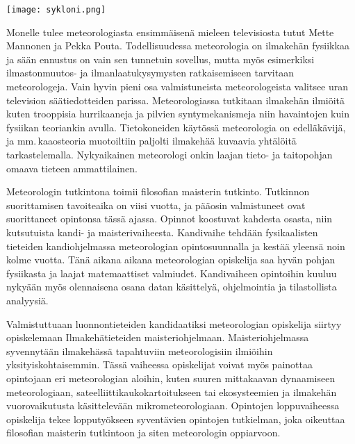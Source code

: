 \documentclass[../ala_hataile.tex]{subfiles}
\begin{document}

\begin{figure*}[!b]
	\texttt{[image: sykloni.png]}
\end{figure*}
Monelle tulee meteorologiasta ensimmäisenä mieleen televisiosta tutut Mette Mannonen ja Pekka Pouta. Todellisuudessa meteorologia on ilmakehän fysiikkaa ja sään ennustus on vain sen tunnetuin sovellus, mutta myös esimerkiksi ilmastonmuutos- ja ilmanlaatukysymysten ratkaisemiseen tarvitaan meteorologeja. Vain hyvin pieni osa valmistuneista meteorologeista valitsee uran television säätiedotteiden parissa. Meteorologiassa tutkitaan ilmakehän ilmiöitä kuten trooppisia hurrikaaneja ja pilvien syntymekanismeja niin havaintojen kuin fysiikan teoriankin avulla. Tietokoneiden käytössä meteorologia on edelläkävijä, ja mm.\,kaaosteoria muotoiltiin paljolti ilmakehää kuvaavia yhtälöitä tarkastelemalla. Nykyaikainen meteorologi onkin laajan tieto- ja taitopohjan omaava tieteen ammattilainen.

Meteorologin tutkintona toimii filosofian maisterin tutkinto. Tutkinnon suorittamisen tavoiteaika on viisi vuotta, ja pääosin valmistuneet ovat suorittaneet opintonsa tässä ajassa. Opinnot koostuvat kahdesta osasta, niin kutsutuista kandi- ja maisterivaiheesta. Kandivaihe tehdään fysikaalisten tieteiden kandiohjelmassa meteorologian opintosuunnalla ja kestää yleensä noin kolme vuotta. Tänä aikana aikana meteorologian opiskelija saa hyvän pohjan fysiikasta ja laajat matemaattiset valmiudet. Kandivaiheen opintoihin kuuluu nykyään myös olennaisena osana datan käsittelyä, ohjelmointia ja tilastollista analyysiä.

Valmistuttuaan luonnon\-tieteiden kandidaatiksi meteorologian opiskelija siirtyy opiskelemaan Ilma\-kehä\-tieteiden maisteri\-ohjelmaan. Maisteri\-ohjelmassa syvennytään ilma\-kehässä tapahtuviin meteorologisiin ilmiöihin yksityis\-kohtaisemmin. Tässä vaiheessa opiskelijat voivat myös painottaa opintojaan eri meteorologian aloihin, kuten suuren mittakaavan dynaamiseen meteorologiaan, sateelliitti\-kauko\-kartoitukseen tai eko\-systeemien ja ilmakehän vuoro\-vaikutusta käsittelevään mikro\-meteorologiaan. Opintojen loppuvaiheessa opiskelija tekee loppu\-työkseen syventävien opintojen tutkielman, joka oikeuttaa filosofian maisterin tutkintoon ja siten meteorologin oppiarvoon.
\end{document}
